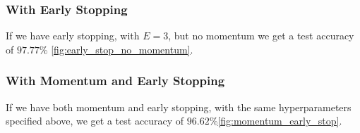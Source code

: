 \subsubsection{With Early Stopping}

If we have early stopping, with $E=3$, but no momentum we get a test accuracy of $97.77\%$ \cref{fig:early_stop_no_momentum}.



\subsubsection{With Momentum and Early Stopping}

If we have both momentum and early stopping, with the same hyperparameters specified above,
we get a test accuracy of $96.62\%$\cref{fig:momentum_early_stop}.

